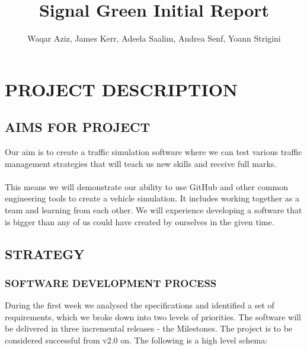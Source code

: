 \documentclass[11pt]{article}
\begin{document}
\title{Signal Green Initial Report}

\author{Waqar Aziz, James Kerr, Adeela Saalim, Andrea Senf, Yoann Strigini}

\maketitle 


\section{PROJECT DESCRIPTION}


\subsection{AIMS FOR PROJECT}

Our aim is to create a traffic simulation software where we can test various traffic management strategies that will teach us new skills and receive full marks. 
\\ \\
This means we will demonstrate our ability to use GitHub and other common engineering tools to create a vehicle simulation. It includes working together as a team and learning from each other. We will experience developing a software that is bigger than any of us could have created by ourselves in the given time. 


\subsection{STRATEGY}

\subsubsection*{SOFTWARE DEVELOPMENT PROCESS}

During the first week we analysed the specifications and identified a set of requirements, which we broke down into two levels of priorities. The software will be delivered in three incremental releases - the Milestones. The project is to be considered successful from v2.0 on. The following is a high level schema:
\end{document}
